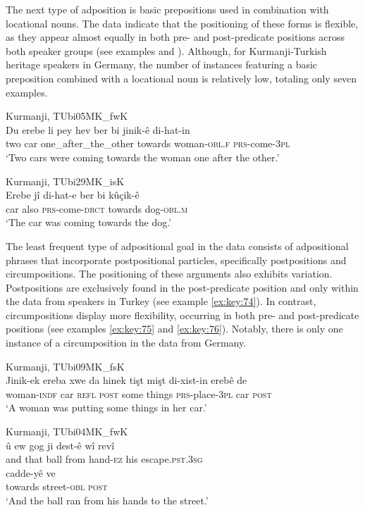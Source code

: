 The next type of adposition is basic prepositions used in combination with locational nouns. The data indicate that the positioning of these forms is flexible, as they appear almost equally in both pre- and post-predicate positions across both speaker groups (see examples  and ). Although, for Kurmanji-Turkish heritage speakers in Germany, the number of instances featuring a basic preposition combined with a locational noun is relatively low, totaling only seven examples.

\ea
  \label{ex:key:72} Kurmanji, TUbi05MK\_fwK \\
\gll Du   erebe   {li pey hev}     {ber bi}     jinik-ê     di-hat-in \\
two  car  one\_after\_the\_other  towards  woman-\textsc{obl.f}  \textsc{prs}-come-\textsc{3pl}\\
\glt ‘Two cars were coming towards the woman one after the other.’ 
  \z

\ea
  \label{ex:key:73} Kurmanji, TUbi29MK\_isK \\
     \gll Erebe   jî   di-hat-e     {ber bi}     kûçik-ê \\
car  also  \textsc{prs}-come-\textsc{drct}  towards {}  dog-\textsc{obl.m}\\
\glt ‘The car was coming towards the dog.’ 
  \z

The least frequent type of adpositional goal in the data consists of adpositional phrases that incorporate postpositional particles, specifically postpositions and circumpositions. The positioning of these arguments also exhibits variation. Postpositions are exclusively found in the post-predicate position and only within the data from speakers in Turkey (see example \ref{ex:key:74}). In contrast, circumpositions display more flexibility, occurring in both pre- and post-predicate positions (see examples \ref{ex:key:75} and \ref{ex:key:76}). Notably, there is only one instance of a circumposition in the data from Germany.

\ea
  \label{ex:key:74} Kurmanji, TUbi09MK\_fsK \\
\gll Jinik-ek   ereba   xwe   da   hinek   {tişt mişt}   di-xist-in   erebê   de\\
woman-\textsc{indf}  car  \textsc{refl}  \textsc{post}  some  things \textsc{prs-}place-\textsc{3pl}  car  \textsc{post}\\
\glt ‘A woman was putting some things in her car.’ 
  \z

\ea
  \label{ex:key:75} Kurmanji, TUbi04MK\_fwK \\
\gll û   ew   gog   ji   dest-ê     wî   revî \\
and  that  ball  from  hand\textsc{-ez}  his  escape\textsc{.pst.3sg}\\
     cadde-yê   ve\\
towards  street-\textsc{obl}  \textsc{post}  \\
\glt ‘And the ball ran from his hands to the street.’ 
  \z
  
